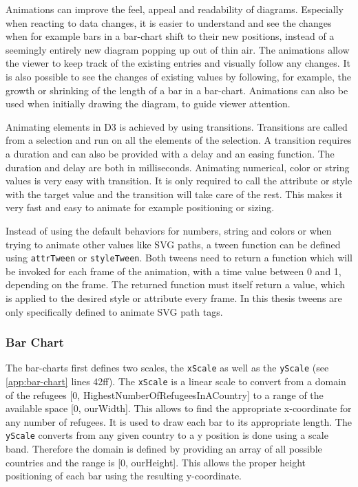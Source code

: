 Animations can improve the feel, appeal and readability of diagrams. Especially when reacting to data changes, it is easier to understand and see the changes when for example bars in a bar-chart shift to their new positions, instead of a seemingly entirely new diagram popping up out of thin air. The animations allow the viewer to keep track of the existing entries and visually follow any changes. It is also possible to see the changes of existing values by following, for example, the growth or shrinking of the length of a bar in a bar-chart. Animations can also be used when initially drawing the diagram, to guide viewer attention.

Animating elements in D3 is achieved by using transitions. Transitions are called from a selection and run on all the elements of the selection. A transition requires a duration and can also be provided with a delay and an easing function. The duration and delay are both in milliseconds. Animating numerical, color or string values is very easy with transition. It is only required to call the attribute or style with the target value and the transition will take care of the rest. This makes it very fast and easy to animate for example positioning or sizing.

Instead of using the default behaviors for numbers, string and colors or when trying to animate other values like SVG paths, a tween function can be defined using \verb|attrTween| or \verb|styleTween|. Both tweens need to return a function which will be invoked for each frame of the animation, with a time value between 0 and 1, depending on the frame. The returned function must itself return a value, which is applied to the desired style or attribute every frame. In this thesis tweens are only specifically defined to animate SVG path tags.


\subsubsection{Bar Chart}

The bar-charts first defines two scales, the \texttt{xScale} as well as the \texttt{yScale} (see \ref{app:bar-chart} lines 42ff). The \texttt{xScale} is a linear scale to convert from a domain of the refugees [0, HighestNumberOfRefugeesInACountry] to a range of the available space [0, ourWidth]. This allows to find the appropriate x-coordinate for any number of refugees. It is used to draw each bar to its appropriate length. The \texttt{yScale} converts from any given country to a y position is done using a scale band. Therefore the domain is defined by providing an array of all possible countries and the range is [0, ourHeight]. This allows the proper height positioning of each bar using the resulting y-coordinate.

